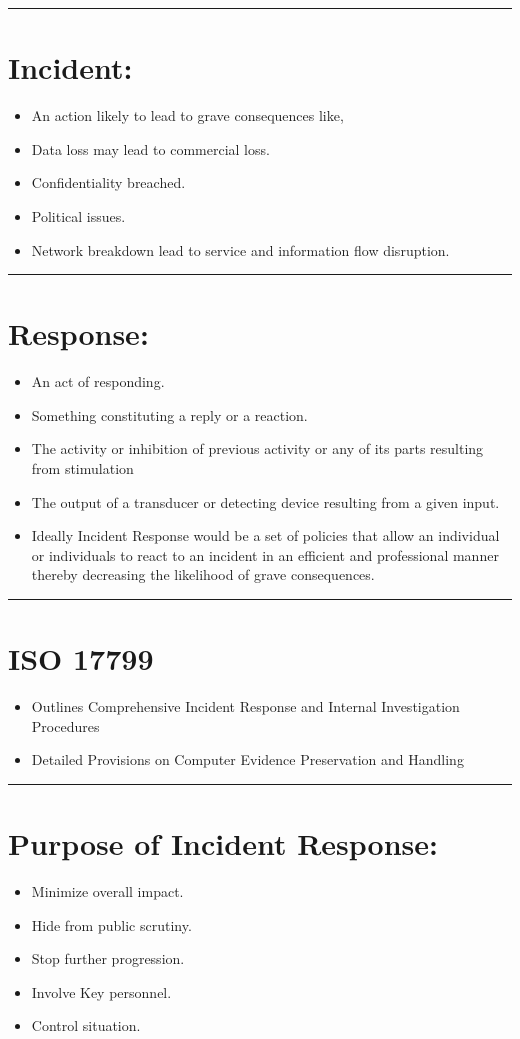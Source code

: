 \documentclass[british]{article}
\begin{document}
\rule[0.5ex]{0.75\columnwidth}{1pt}

\section{Incident:}
\begin{itemize}
\item An action likely to lead to grave consequences like,
\item Data loss may lead to commercial loss.
\item Confidentiality breached.
\item Political issues.
\item Network breakdown lead to service and information flow disruption.
\end{itemize}
\rule[0.5ex]{0.75\columnwidth}{1pt}

\section{Response:}
\begin{itemize}
\item An act of responding.
\item Something constituting a reply or a reaction.
\item The activity or inhibition of previous activity or any of its parts
resulting from stimulation
\item The output of a transducer or detecting device resulting from a given
input.
\item Ideally Incident Response would be a set of policies that allow an
individual or individuals to react to an incident in an efficient
and professional manner thereby decreasing the likelihood of grave
consequences.
\end{itemize}
\rule[0.5ex]{0.75\columnwidth}{1pt}

\section{ISO 17799}
\begin{itemize}
\item Outlines Comprehensive Incident Response and Internal Investigation
Procedures
\item Detailed Provisions on Computer Evidence Preservation and Handling
\end{itemize}
\rule[0.5ex]{0.75\columnwidth}{1pt}

\section{Purpose of Incident Response:}
\begin{itemize}
\item Minimize overall impact.
\item Hide from public scrutiny.
\item Stop further progression.
\item Involve Key personnel.
\item Control situation.
\end{itemize}
\end{document}
